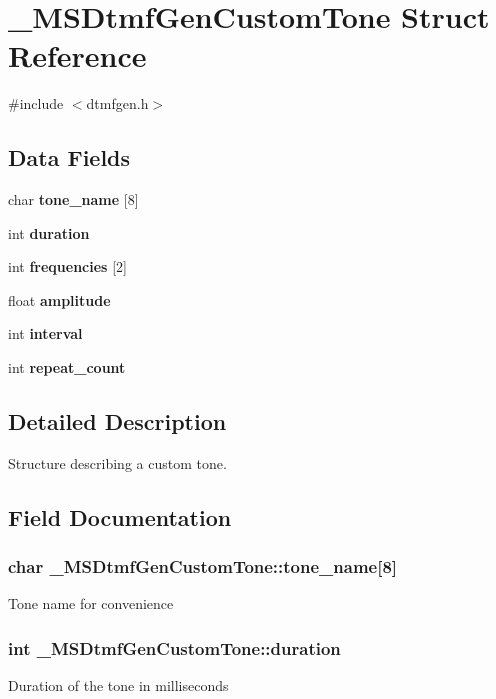\section{\-\_\-\-M\-S\-Dtmf\-Gen\-Custom\-Tone Struct Reference}
\label{struct__MSDtmfGenCustomTone}


{\ttfamily \#include $<$dtmfgen.\-h$>$}

\subsection*{Data Fields}
\begin{DoxyCompactItemize}
\item 
char {\bf tone\-\_\-name} [8]
\item 
int {\bf duration}
\item 
int {\bf frequencies} [2]
\item 
float {\bf amplitude}
\item 
int {\bf interval}
\item 
int {\bf repeat\-\_\-count}
\end{DoxyCompactItemize}


\subsection{Detailed Description}
Structure describing a custom tone. 

\subsection{Field Documentation}
\subsubsection[{tone\-\_\-name}]{\setlength{\rightskip}{0pt plus 5cm}char \-\_\-\-M\-S\-Dtmf\-Gen\-Custom\-Tone\-::tone\-\_\-name[8]}\label{struct__MSDtmfGenCustomTone_a5e609c3c1053e64fa7675bfc85abdb9d}
Tone name for convenience 
\subsubsection[{duration}]{\setlength{\rightskip}{0pt plus 5cm}int \-\_\-\-M\-S\-Dtmf\-Gen\-Custom\-Tone\-::duration}\label{struct__MSDtmfGenCustomTone_a78f4cd97c40ab6d3255d3103852b44b1}
Duration of the tone in milliseconds 
